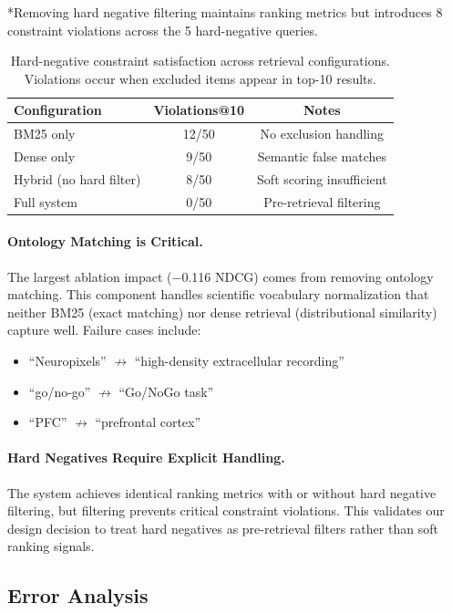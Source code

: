 \documentclass{article}
\theoremstyle{definition}
\begin{document}
*Removing hard negative filtering maintains ranking metrics but introduces 8 constraint violations across the 5 hard-negative queries.

\begin{table}[t]
\centering
\small
\caption{Hard-negative constraint satisfaction across retrieval configurations. Violations occur when excluded items appear in top-10 results.}
\label{tab:hard-negative}
\begin{tabular}{lcc}
\toprule
\textbf{Configuration} & \textbf{Violations@10} & \textbf{Notes} \\
\midrule
BM25 only & 12/50 & No exclusion handling \\
Dense only & 9/50 & Semantic false matches \\
Hybrid (no hard filter) & 8/50 & Soft scoring insufficient \\
Full system & 0/50 & Pre-retrieval filtering \\
\bottomrule
\end{tabular}
\end{table}

\paragraph{Ontology Matching is Critical.} The largest ablation impact ($-$0.116 NDCG) comes from removing ontology matching. This component handles scientific vocabulary normalization that neither BM25 (exact matching) nor dense retrieval (distributional similarity) capture well. Failure cases include:
\begin{itemize}
    \item ``Neuropixels'' $\not\rightarrow$ ``high-density extracellular recording''
    \item ``go/no-go'' $\not\rightarrow$ ``Go/NoGo task''
    \item ``PFC'' $\not\rightarrow$ ``prefrontal cortex''
\end{itemize}

\paragraph{Hard Negatives Require Explicit Handling.} The system achieves identical ranking metrics with or without hard negative filtering, but filtering prevents critical constraint violations. This validates our design decision to treat hard negatives as pre-retrieval filters rather than soft ranking signals.

\subsection{Error Analysis}
\end{document}
